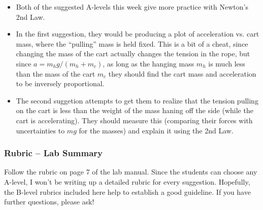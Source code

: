 \documentclass[fleqn,letterpaper]{article}
\begin{document}
\begin{itemize}
 \item{Both of the suggested A-levels this week give more practice with Newton's 2nd Law.}
 \item{In the first suggestion, they would be producing a plot of acceleration vs. cart mass, where the ``pulling'' mass is held fixed.  This is a bit of a cheat, since changing the mass of the cart actually changes the tension in the rope, but since $a = m_h g / (m_h + m_c)$, as long as the hanging mass $m_h$ is much less than the mass of the cart $m_c$ they should find the cart mass and acceleration to be inversely proportional.}
 \item{The second suggetion attempts to get them to realize that the tension pulling on the cart is less than the weight of the mass haning off the side (while the cart is accelerating).  They should measure this (comparing their forces with uncertainties to $mg$ for the masses) and explain it using the 2nd Law.}
\end{itemize}

\subsubsection*{Rubric -- Lab Summary}

Follow the rubric on page 7 of the lab manual.  Since the students can choose any A-level, I won't be writing up a detailed rubric for every suggestion.  Hopefully, the B-level rubrics included here help to establish a good guideline.  If you have further questions, please ask!

\label{LastPage}
\end{document}
